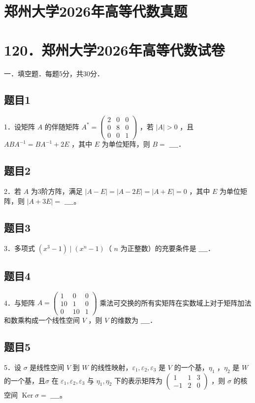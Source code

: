 \documentclass{article}
\begin{document}
\section*{郑州大学2026年高等代数真题}
\section*{120．郑州大学2026年高等代数试卷}

一．填空题．每题5分，共30分．

\subsection{题目1}
1．设矩阵 \(A\) 的伴随矩阵 \(A^{*}=\left(\begin{array}{lll}2 & 0 & 0 \\ 0 & 8 & 0 \\ 0 & 0 & 1\end{array}\right)\) ，若 \(|A|>0\) ，且 \(A B A^{-1}=B A^{-1}+2 E\) ，其中 \(E\) 为单位矩阵，则 \(B=\) \(\_\_\_\_\)．

\subsection{题目2}
2．若 \(A\) 为3阶方阵，满足 \(|A-E|=|A-2 E|=|A+E|=0\) ，其中 \(E\) 为单位矩阵，则 \(|A+3 E|=\)
\(\_\_\_\_\)。

\subsection{题目3}
3．多项式 \(\left(x^{3}-1\right) \mid\left(x^{n}-1\right)\)（ \(n\) 为正整数）的充要条件是 \(\_\_\_\_\)．

\subsection{题目4}
4．与矩阵 \(A=\left(\begin{array}{ccc}1 & 0 & 0 \\ 10 & 1 & 0 \\ 0 & 10 & 1\end{array}\right)\) 乘法可交换的所有实矩阵在实数域上对于矩阵加法和数乘构成一个线性空间 \(V\) ，则 \(V\) 的维数为 \(\_\_\_\_\)．

\subsection{题目5}
5．设 \(\sigma\) 是线性空间 \(V\) 到 \(W\) 的线性映射，\(\varepsilon_{1}, \varepsilon_{2}, \varepsilon_{3}\) 是 \(V\) 的一个基，\(\eta_{1}\) ，\(\eta_{2}\) 是 \(W\) 的一个基，且\(\sigma\) 在 \(\varepsilon_{1}, \varepsilon_{2}, \varepsilon_{3}\) 与 \(\eta_{1}, \eta_{2}\) 下的表示矩阵为 \(\left(\begin{array}{ccc}1 & 1 & 3 \\ -1 & 2 & 0\end{array}\right)\) ，则 \(\sigma\) 的核空间 \(\operatorname{Ker} \sigma=\) \(\_\_\_\_\)。
\end{document}

